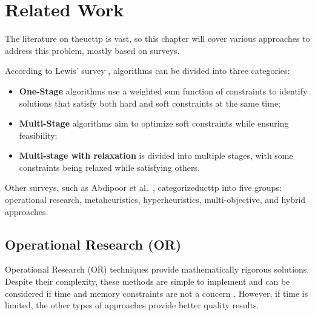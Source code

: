 
\chapter{Related Work}


\label{Related Work}

The literature on the\ac{ucttp} is vast, so this chapter will cover various approaches to address this problem, mostly based on surveys.

According to Lewis' survey \cite{lewis_survey_2008}, algorithms can be divided into three categories:

\begin{itemize}
	\item \textbf{One-Stage} algorithms use a weighted sum function of constraints to identify solutions that satisfy both hard and soft constraints at the same time;
	\item \textbf{Multi-Stage} algorithms aim to optimize soft constraints while ensuring feasibility;
	\item \textbf{Multi-stage with relaxation} is divided into multiple stages, with some constraints being relaxed while satisfying others.
\end{itemize}

Other surveys, such as Abdipoor et al.\ \cite{abdipoor_meta-heuristic_2023}, categorized\ac{ucttp} into five groups: operational research, metaheuristics, hyperheuristics, multi-objective, and hybrid approaches.

\section{Operational Research (OR)}

Operational Research (OR) techniques provide mathematically rigorous solutions. Despite their complexity, these methods are simple to implement and can be considered if time and memory constraints are not a concern \cite{babaei_survey_2015}. However, if time is limited, the other types of approaches provide better quality results. 

